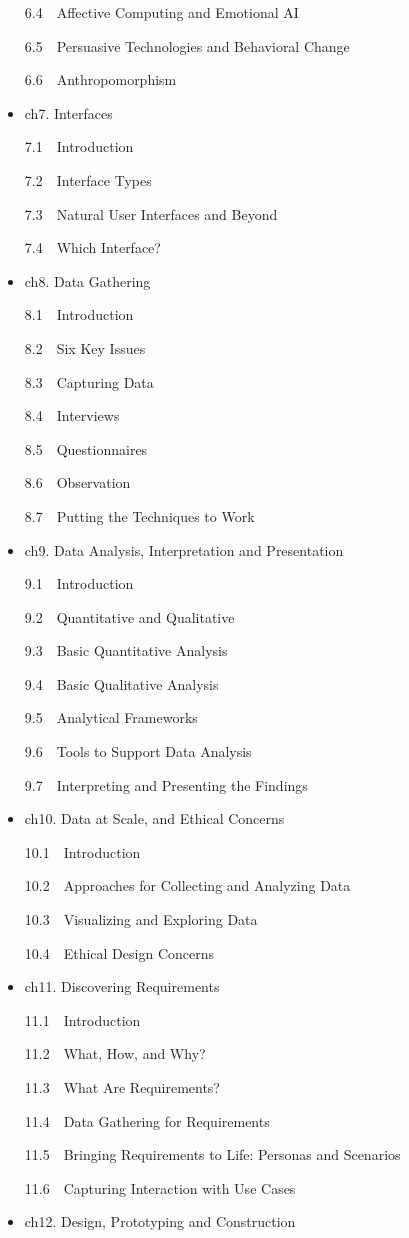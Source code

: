 \documentclass[
  letterpaper,
]{book}
\begin{document}
\begin{itemize}
  6.4 Affective Computing and Emotional AI

  6.5 Persuasive Technologies and Behavioral Change

  6.6 Anthropomorphism
\item
  ch7. Interfaces

  7.1 Introduction

  7.2 Interface Types

  7.3 Natural User Interfaces and Beyond

  7.4 Which Interface?
\item
  ch8. Data Gathering

  8.1 Introduction

  8.2 Six Key Issues

  8.3 Capturing Data

  8.4 Interviews

  8.5 Questionnaires

  8.6 Observation

  8.7 Putting the Techniques to Work
\item
  ch9. Data Analysis, Interpretation and Presentation

  9.1 Introduction

  9.2 Quantitative and Qualitative

  9.3 Basic Quantitative Analysis

  9.4 Basic Qualitative Analysis

  9.5 Analytical Frameworks

  9.6 Tools to Support Data Analysis

  9.7 Interpreting and Presenting the Findings
\item
  ch10. Data at Scale, and Ethical Concerns

  10.1 Introduction

  10.2 Approaches for Collecting and Analyzing Data

  10.3 Visualizing and Exploring Data

  10.4 Ethical Design Concerns
\item
  ch11. Discovering Requirements

  11.1 Introduction

  11.2 What, How, and Why?

  11.3 What Are Requirements?

  11.4 Data Gathering for Requirements

  11.5 Bringing Requirements to Life: Personas and Scenarios

  11.6 Capturing Interaction with Use Cases
\item
  ch12. Design, Prototyping and Construction


\end{itemize}
\end{document}
